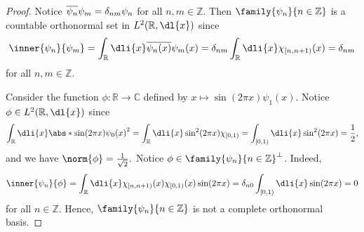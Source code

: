 \begin{proof}
    Notice \(\overline{\psi_n} \psi_m = \delta_{nm} \psi_n\) for all \(n,m \in \mathbb{Z}\). Then \(\family{\psi_n}{n\in \mathbb{Z}}\) is a countable orthonormal set in \(L^2(\mathbb{R}, \dl{x})\) since
    \begin{equation*}
        \inner{\psi_n}{\psi_m} = \int_{\mathbb{R}} \dli{x} \conj{\psi_n(x)}\psi_m(x) = \delta_{nm} \int_{\mathbb{R}} \dli{x}\chi_{[n, n+1)}(x) = \delta_{nm}
    \end{equation*}
    for all \(n,m \in \mathbb{Z}\).

    Consider the function \(\phi : \mathbb{R} \to \mathbb{C}\) defined by \(x \mapsto \sin(2\pi x)\psi_1(x)\). Notice \(\phi \in L^2(\mathbb{R}, \dl{x})\) since
    \begin{equation*}
        \int_{\mathbb{R}} \dli{x} \abs*{\sin(2\pi x) \psi_0(x)}^2 = \int_{\mathbb{R}} \dli{x} \sin^2(2\pi x) \chi_{[0,1)} = \int_{[0,1)} \dli{x} \sin^2(2\pi x) = \frac1{2},
    \end{equation*}
    and we have \(\norm{\phi} = \frac1{\sqrt{2}}.\) Notice \(\phi \in \family{\psi_n}{n\in \mathbb{Z}}^\perp\). Indeed,
    \begin{equation*}
        \inner{\psi_n}{\phi} = \int_{\mathbb{R}} \dli{x} \chi_{[n,n+1)}(x) \chi_{[0,1)}(x) \sin(2\pi x) = \delta_{n0} \int_{[0,1)} \dli{x} \sin(2\pi x) = 0
    \end{equation*}
    for all \(n \in \mathbb{Z}\). Hence, \(\family{\psi_n}{n\in \mathbb{Z}}\) is not a complete orthonormal basis.
\end{proof}

